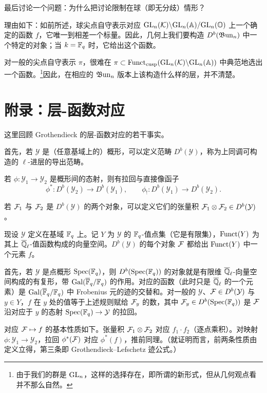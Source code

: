 最后讨论一个问题：为什么把讨论限制在球（即无分歧）情形？

理由如下：如前所述，球尖点自守表示对应 $\mathrm{GL}_n(\mathcal{K})\backslash\mathrm{GL}_n(\mathbb{A})/\mathrm{GL}_n(\mathbb{O})$ 上一个确定的函数 $f$，它唯一到相差一个标量。因此，几何上我们要构造 $D^b(\mathfrak{B}\mathrm{un}_n)$ 中一个特定的对象；当 $k=\mathbb{F}_q$ 时，它给出这个函数。

对一般的尖点自守表示 $\pi$，很难在 $\pi\subset\operatorname{Funct}_{\mathrm{cusp}}(\mathrm{GL}_n(\mathcal{K})\backslash\mathrm{GL}_n(\mathbb{A}))$ 中典范地选出一个函数。\footnote{由于我们的群是 $\mathrm{GL}_n$，这样的选择存在，即所谓的新形式，但从几何观点看并不那么自然。}因此，在相应的 $\mathfrak{B}\mathrm{un}_n$ 版本上该构造什么样的层，并不清楚。

\section{附录：层-函数对应}

这里回顾 Grothendieck 的层-函数对应的若干事实。

首先，若 $\mathcal{Y}$ 是（任意基域上的）概形，可以定义范畴 $D^b(\mathcal{Y})$，称为上同调可构造的 $\ell$-进层的导出范畴。

若 $\phi:\mathcal{Y}_1\to\mathcal{Y}_2$ 是概形间的态射，则有拉回与直接像函子
\[
\phi^*:D^b(\mathcal{Y}_2)\to D^b(\mathcal{Y}_1),\qquad
\phi_!:D^b(\mathcal{Y}_1)\to D^b(\mathcal{Y}_2).
\]

若 $\mathcal{F}_1$ 与 $\mathcal{F}_2$ 是 $D^b(\mathcal{Y})$ 的两个对象，可以定义它们的张量积 $\mathcal{F}_1\otimes\mathcal{F}_2\in D^b(\mathcal{Y})$。

现设 $\mathcal{Y}$ 定义在基域 $\mathbb{F}_q$ 上。记 $Y$ 为 $\mathcal{Y}$ 的 $\mathbb{F}_q$-值点集（它是有限集），$\operatorname{Funct}(Y)$ 为其上 $\overline{\mathbb{Q}}_\ell$-值函数构成的向量空间。$D^b(\mathcal{Y})$ 的每个对象 $\mathcal{F}$ 都给出 $\operatorname{Funct}(Y)$ 中一个元素 $f$。

首先，若 $\mathcal{Y}$ 是点概形 $\operatorname{Spec}(\mathbb{F}_q)$，则 $D^b(\operatorname{Spec}(\mathbb{F}_q))$ 的对象就是有限维 $\overline{\mathbb{Q}}_\ell$-向量空间构成的有复形，带 $\mathrm{Gal}(\overline{\mathbb{F}}_q/\mathbb{F}_q)$ 的作用。对应的函数（此时只是 $\overline{\mathbb{Q}}_\ell$ 的一个元素）是 $\mathrm{Gal}(\overline{\mathbb{F}}_q/\mathbb{F}_q)$ 中 Frobenius 元的迹的交替和。对一般的 $\mathcal{Y}$、$\mathcal{F}\in D^b(\mathcal{Y})$ 与 $y\in Y$，$f$ 在 $y$ 处的值等于上述规则赋给 $\mathcal{F}_y$ 的数，其中 $\mathcal{F}_y\in D^b(\operatorname{Spec}(\mathbb{F}_q))$ 是 $\mathcal{F}$ 沿对应于 $y$ 的态射 $\operatorname{Spec}(\mathbb{F}_q)\to\mathcal{Y}$ 的拉回。

对应 $\mathcal{F}\mapsto f$ 的基本性质如下。张量积 $\mathcal{F}_1\otimes\mathcal{F}_2$ 对应 $f_1\cdot f_2$（逐点乘积）。对映射 $\phi:\mathcal{Y}_1\to\mathcal{Y}_2$，拉回 $\phi^*(\mathcal{F})$ 对应 $\phi^*(f)$，推前同理。（就证明而言，前两条性质由定义立得，第三条即 Grothendieck--Lefschetz 迹公式。）

